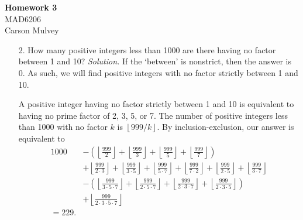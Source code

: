 \documentclass[11pt,letterpaper]{article}
\newcommand{\floor}[1]{\left\lfloor{#1}\right\rfloor}
\newenvironment{solution}{\color{black}\textit{Solution.}}{\color{gray}}
\begin{document}
\begin{center}
    \begin{large}
        \textbf{Homework 3} \\
        MAD6206 \\
        Carson Mulvey
    \end{large}
\end{center}

\color{gray}

\begin{enumerate}

    \item[2.] How many positive integers less than 1000 are there having no factor between 1 and 10?
    \begin{solution}
        If the `between' is nonstrict, then the answer is 0. As such, we will find positive integers with no factor strictly between 1 and 10.

        A positive integer having no factor strictly between 1 and 10 is equivalent to having no prime factor of 2, 3, 5, or 7. The number of positive integers less than 1000 with no factor $k$ is $\floor{999/k}$.
        By inclusion-exclusion, our answer is equivalent to
        \begin{align*}
            1000 &- \left(
                \floor{\frac{999}{2}} +
                \floor{\frac{999}{3}} +
                \floor{\frac{999}{5}} +
                \floor{\frac{999}{7}}
            \right)\\
            &+ 
                \floor{\frac{999}{2 \cdot 3}} +
                \floor{\frac{999}{3 \cdot 5}} +
                \floor{\frac{999}{5 \cdot 7}} +
                \floor{\frac{999}{7 \cdot 2}} +
                \floor{\frac{999}{2 \cdot 5}} +
                \floor{\frac{999}{3 \cdot 7}}
                \\
            &- \left(
                \floor{\frac{999}{3\cdot 5\cdot 7}} +
                \floor{\frac{999}{2\cdot 5\cdot 7}} +
                \floor{\frac{999}{2\cdot 3\cdot 7}} +
                \floor{\frac{999}{2\cdot 3\cdot 5}}
            \right)\\
            &+ \floor{\frac{999}{2\cdot 3\cdot 5 \cdot 7}} \\
            = 229.
        \end{align*}
    \end{solution}
    

\end{enumerate}
\end{document}

